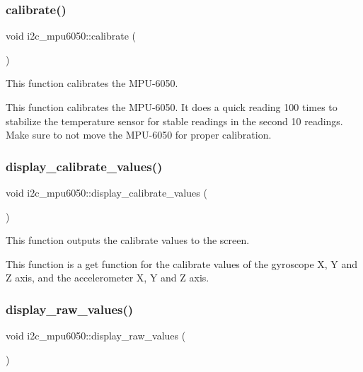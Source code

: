 \subsubsection{\texorpdfstring{calibrate()}{calibrate()}}
{\footnotesize\ttfamily void i2c\+\_\+mpu6050\+::calibrate (\begin{DoxyParamCaption}{ }\end{DoxyParamCaption})}



This function calibrates the M\+P\+U-\/6050. 

This function calibrates the M\+P\+U-\/6050. It does a quick reading 100 times to stabilize the temperature sensor for stable readings in the second 10 readings. Make sure to not move the M\+P\+U-\/6050 for proper calibration. \mbox{\label{classi2c__mpu6050_a6da4020009994ec37d4388ede0284074}} 
\subsubsection{\texorpdfstring{display\+\_\+calibrate\+\_\+values()}{display\_calibrate\_values()}}
{\footnotesize\ttfamily void i2c\+\_\+mpu6050\+::display\+\_\+calibrate\+\_\+values (\begin{DoxyParamCaption}{ }\end{DoxyParamCaption})}



This function outputs the calibrate values to the screen. 

This function is a get function for the calibrate values of the gyroscope X, Y and Z axis, and the accelerometer X, Y and Z axis. \mbox{\label{classi2c__mpu6050_a24a1e7c044411670d724d1c3e411eea5}} 
\subsubsection{\texorpdfstring{display\+\_\+raw\+\_\+values()}{display\_raw\_values()}}
{\footnotesize\ttfamily void i2c\+\_\+mpu6050\+::display\+\_\+raw\+\_\+values (\begin{DoxyParamCaption}{ }\end{DoxyParamCaption})}



